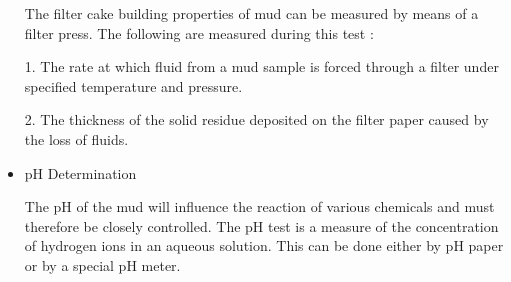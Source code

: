 \begin{itemize}
The filter cake building properties of mud can be measured by means of a filter press. The following are measured during this test :

1. The rate at which fluid from a mud sample is forced through a filter under specified temperature and pressure.

2. The thickness of the solid residue deposited on the filter paper caused by the loss of fluids.

\item pH Determination

The pH of the mud will influence the reaction of various chemicals and must therefore be closely controlled. The pH test is a measure of the concentration of hydrogen ions in an aqueous solution. This can be done either by pH paper or by a special pH meter.

\end{itemize}
 
 
 